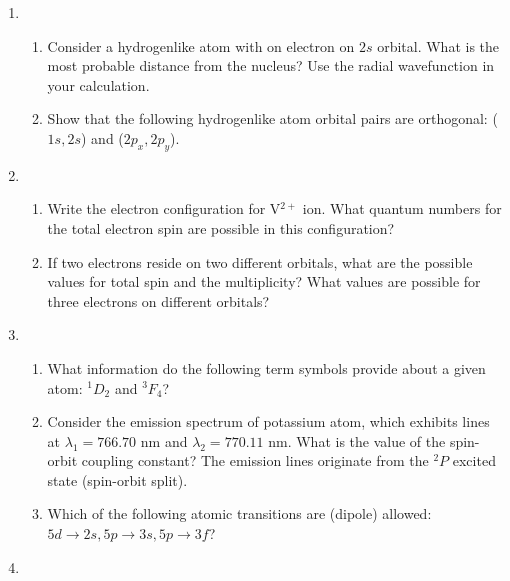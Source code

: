 \begin{enumerate}
\item 

\begin{enumerate}
\item Consider a hydrogenlike atom with on electron on $2s$ orbital. What is the most probable distance from the nucleus? Use the radial wavefunction in your calculation.
\item Show that the following hydrogenlike atom orbital pairs are orthogonal: ($1s,2s$) and ($2p_x, 2p_y$).
\end{enumerate}



\item 

\begin{enumerate}
\item Write the electron configuration for V$^{2+}$ ion. What quantum numbers for the total electron spin are possible in this configuration?
\item If two electrons reside on two different orbitals, what are the possible values for total spin and the multiplicity? What values are possible for three electrons on different orbitals?
\end{enumerate}



\item 

\begin{enumerate}
\item What information do the following term symbols provide about a given atom: $^1D_2$ and $^3F_4$?
\item Consider the emission spectrum of potassium atom, which exhibits lines at $\lambda_1 = 766.70$ nm and $\lambda_2 = 770.11$ nm. What is the value of the spin-orbit coupling constant? The emission lines originate from the $^2P$ excited state (spin-orbit split).
\item Which of the following atomic transitions are (dipole) allowed: $5d\rightarrow 2s, 5p \rightarrow 3s, 5p \rightarrow 3f$?
\end{enumerate}



\item


\end{enumerate}
